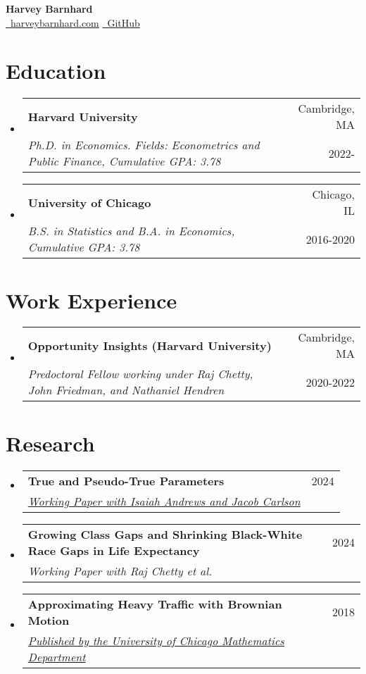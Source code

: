 \documentclass[12pt,]{article}
\makeatletter
\newcommand{\resumeSubheading}[4]{
  \vspace{-2pt}\item
    \begin{tabular*}{0.97\textwidth}[t]{l@{\extracolsep{\fill}}r}
      \textbf{#1} & #2 \\
      \textit{\small#3} & {\small #4} \\
    \end{tabular*}\vspace{-7pt}
}
\makeatother
\begin{document}
\begin{center} 
{\huge \bfseries Harvey Barnhard\\}
{\href{https://harveybarnhard.com}{\faGlobe\ harveybarnhard.com} }
{\href{https://github.com/harveybarnhard}{\faGithub\ GitHub}\\ }
\end{center}

\section*{Education}
\begin{itemize}[leftmargin=0.09in, label={}]
\resumeSubheading
      {Harvard University}{Cambridge, MA}
      {Ph.D. in Economics. Fields: Econometrics and Public Finance, Cumulative GPA: 3.78}{2022-}
\resumeSubheading
      {University of Chicago}{Chicago, IL}
      {B.S. in Statistics and B.A. in Economics, Cumulative GPA: 3.78}{2016-2020}
\end{itemize}

\section*{Work Experience}
\begin{itemize}[leftmargin=0.09in, label={}]
\resumeSubheading
      {Opportunity Insights (Harvard University)}{Cambridge, MA}
      {Predoctoral Fellow working under Raj Chetty, John Friedman, and Nathaniel Hendren}{2020-2022}
\end{itemize}

\section*{Research}
\begin{itemize}[leftmargin=0.09in, label={}]
\resumeSubheading
      {True and Pseudo-True Parameters}{2024}
      {\href{https://economics.mit.edu/sites/default/files/2024-04/True\%20and\%20Pseudo-True\%20Parameters.pdf}{{\scriptsize \faLink} Working Paper with Isaiah Andrews and Jacob Carlson}}{}
\resumeSubheading
      {Growing Class Gaps and Shrinking Black-White Race Gaps in Life Expectancy}{2024}
      {{Working Paper with Raj Chetty et al.}}{}
\resumeSubheading
      {Approximating Heavy Traffic with Brownian Motion}{2018}
      {\href{http://math.uchicago.edu/~may/REU2018/REUPapers/Barnhard.pdf}{{\scriptsize \faLink} Published by the University of Chicago Mathematics Department}}{}
\end{itemize}
\end{document}
